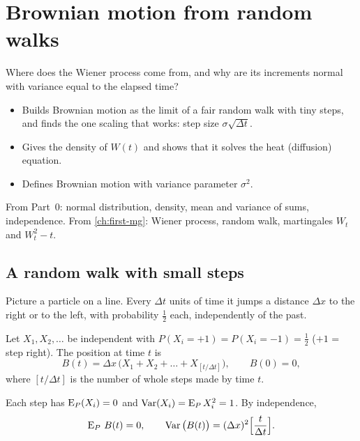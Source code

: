 \chapter{Brownian motion from random walks}
\label{ch:bm-walks}

\begin{question}
Where does the Wiener process come from, and why are its increments normal with variance equal to the elapsed time?
\end{question}

\begin{whatfor}
\begin{itemize}
  \item Builds Brownian motion as the limit of a fair random walk with tiny steps, and finds the one scaling that works: step size $\sigma\sqrt{\Delta t}$.
  \item Gives the density of $W(t)$ and shows that it solves the heat (diffusion) equation.
  \item Defines Brownian motion with variance parameter $\sigma^2$.
\end{itemize}
\end{whatfor}

\begin{prereq}
From Part~0: normal distribution, density, mean and variance of sums, independence. From \cref{ch:first-mg}: Wiener process, random walk, martingales $W_t$ and $W_t^2-t$.
\end{prereq}

\section{A random walk with small steps}

Picture a particle on a line. Every $\Delta t$ units of time it jumps a distance $\Delta x$ to the right or to the left, with probability $\frac12$ each, independently of the past.

\begin{setup}
Let $X_1,X_2,\ldots$ be independent with $P(X_i=+1)=P(X_i=-1)=\frac12$ ($+1$ = step right). The position at time $t$ is
\[
  B(t)=\Delta x\,\big(X_1+X_2+\dots+X_{[t/\Delta t]}\big),\qquad B(0)=0,
\]
where $[t/\Delta t]$ is the number of whole steps made by time $t$.
\end{setup}

Each step has $\operatorname{E}_P(X_i)=0$ and $\operatorname{Var}(X_i)=\operatorname{E}_PX_i^2=1$. By independence,
\[
  \operatorname{E}_P\,B(t)=0,\qquad \operatorname{Var}\big(B(t)\big)=(\Delta x)^2\Big[\frac{t}{\Delta t}\Big].
\]

